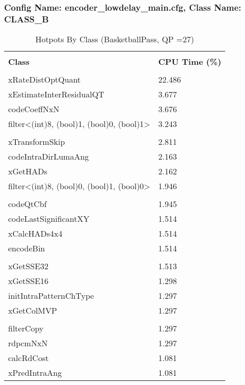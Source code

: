 \documentclass{article}%
\begin{document}
\subsubsection{Config Name: encoder\_lowdelay\_main.cfg, Class Name: CLASS\_B}%
\label{ssubsec:ConfigNameencoderlowdelaymain.cfg,ClassNameCLASSB}%
\begin{longtabu}{| X[l] | X[l] |}%
\caption{%
Hotpots By Class (BasketballPass, QP =27)%
}%
\hline%
&\\%
\textbf{Class}&\textbf{CPU Time (\%)}\\%
&\\%
\hline%
\endhead%
xRateDistOptQuant&22.486\\%
\hline%
xEstimateInterResidualQT&3.677\\%
\hline%
codeCoeffNxN&3.676\\%
\hline%
filter<(int)8, (bool)1, (bool)0, (bool)1>&3.243\\%
\hline%
&\\%
\hline%
xTransformSkip&2.811\\%
\hline%
codeIntraDirLumaAng&2.163\\%
\hline%
xGetHADs&2.162\\%
\hline%
filter<(int)8, (bool)0, (bool)1, (bool)0>&1.946\\%
\hline%
&\\%
\hline%
codeQtCbf&1.945\\%
\hline%
codeLastSignificantXY&1.514\\%
\hline%
xCalcHADs4x4&1.514\\%
\hline%
encodeBin&1.514\\%
\hline%
&\\%
\hline%
xGetSSE32&1.513\\%
\hline%
xGetSSE16&1.298\\%
\hline%
initIntraPatternChType&1.297\\%
\hline%
xGetColMVP&1.297\\%
\hline%
&\\%
\hline%
filterCopy&1.297\\%
\hline%
rdpcmNxN&1.297\\%
\hline%
calcRdCost&1.081\\%
\hline%
xPredIntraAng&1.081\\%
\hline%
\end{longtabu}%
\newpage%
\end{document}
